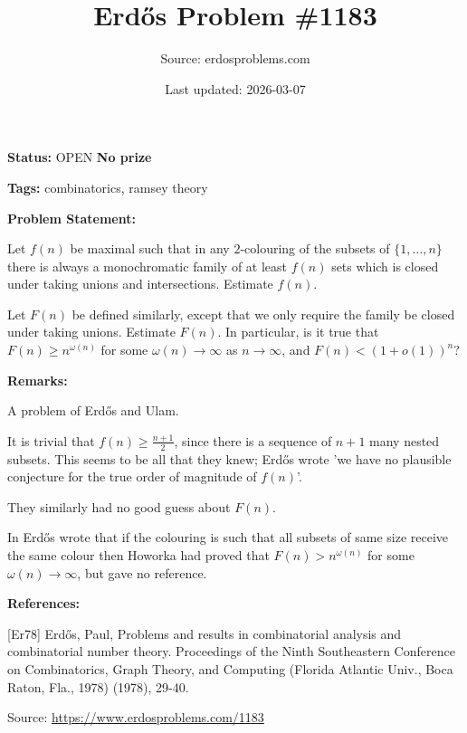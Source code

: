 \documentclass{article}
\title{Erd\H{o}s Problem \#1183}
\date{Last updated: 2026-03-07}
\author{Source: erdosproblems.com}
\begin{document}
\maketitle

\noindent\textbf{Status:} OPEN \quad \textbf{No prize}

\noindent\textbf{Tags:} combinatorics, ramsey theory

\medskip
\noindent\textbf{Problem Statement:}

Let $f(n)$ be maximal such that in any $2$-colouring of the subsets of $\{1,\ldots,n\}$ there is always a monochromatic family of at least $f(n)$ sets which is closed under taking unions and intersections. Estimate $f(n)$.

Let $F(n)$ be defined similarly, except that we only require the family be closed under taking unions. Estimate $F(n)$. In particular, is it true that $F(n)\geq n^{\omega(n)}$ for some $\omega(n)\to \infty$ as $n\to \infty$, and $F(n)<(1+o(1))^n$?

\bigskip
\noindent\textbf{Remarks:}

A problem of Erd\H{o}s and Ulam.

It is trivial that $f(n)\geq \frac{n+1}{2}$, since there is a sequence of $n+1$ many nested subsets. This seems to be all that they knew; Erd\H{o}s \cite{Er78} wrote 'we have no plausible conjecture for the true order of magnitude of $f(n)$'.

They similarly had no good guess about $F(n)$.

In \cite{Er78} Erd\H{o}s wrote that if the colouring is such that all subsets of same size receive the same colour then Howorka had proved that $F(n)>n^{\omega(n)}$ for some $\omega(n)\to \infty$, but gave no reference.

\bigskip
\noindent\textbf{References:}

[Er78] Erd\H{o}s, Paul, Problems and results in combinatorial analysis and combinatorial number theory. Proceedings of the Ninth Southeastern Conference on Combinatorics, Graph Theory, and Computing (Florida Atlantic Univ., Boca Raton, Fla., 1978) (1978), 29-40.

\bigskip
\noindent\small{Source: \url{https://www.erdosproblems.com/1183}}
\end{document}
